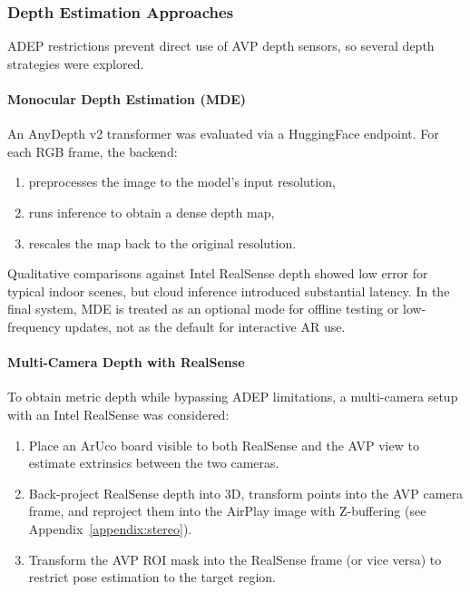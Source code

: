 \subsubsection{Depth Estimation Approaches}

ADEP restrictions prevent direct use of AVP depth sensors, so several depth strategies were explored.

\paragraph*{Monocular Depth Estimation (MDE)}

An AnyDepth v2 transformer was evaluated via a HuggingFace endpoint. For each RGB frame, the backend:
\begin{enumerate}
    \item preprocesses the image to the model’s input resolution,
    \item runs inference to obtain a dense depth map,
    \item rescales the map back to the original resolution.
\end{enumerate}

Qualitative comparisons against Intel RealSense depth showed low error for typical indoor scenes, but cloud inference introduced substantial latency. In the final system, MDE is treated as an optional mode for offline testing or low-frequency updates, not as the default for interactive AR use.

\paragraph*{Multi-Camera Depth with RealSense}

To obtain metric depth while bypassing ADEP limitations, a multi-camera setup with an Intel RealSense was considered:

\begin{enumerate}
    \item Place an ArUco board visible to both RealSense and the AVP view to estimate extrinsics between the two cameras.
    \item Back-project RealSense depth into 3D, transform points into the AVP camera frame, and reproject them into the AirPlay image with Z-buffering (see Appendix~\ref{appendix:stereo}).
    \item Transform the AVP ROI mask into the RealSense frame (or vice versa) to restrict pose estimation to the target region.
\end{enumerate}

